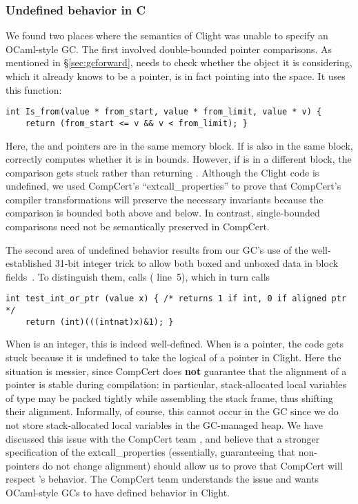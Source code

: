 \subsubsection*{Undefined behavior in C} %
We found two places where the semantics of Clight was unable to specify an OCaml-style GC.
The first involved double-bounded pointer comparisons.
As mentioned in \S\ref{sec:gcforward},  needs to
check whether the object it is considering, which it already knows to be a pointer,
is in fact pointing into the  space. It uses this function:
\begin{lstlisting}[numbers=none]
  int Is_from(value * from_start, value * from_limit, value * v) {
    return (from_start <= v && v < from_limit); }
\end{lstlisting}
Here, the  and  pointers are in the same
memory block. If  is also in the same block, 
correctly computes whether it is in bounds.
However, if  is in a different block, the comparison gets stuck rather than
returning .
Although the Clight code is undefined, we used CompCert's ``extcall{\_}properties''
to prove that CompCert's compiler transformations will preserve the necessary invariants
because the comparison is bounded both above and below. In contrast, single-bounded
comparisons need not be semantically preserved in CompCert.

The second area of undefined behavior results from our GC's use of the well-established
31-bit integer trick to allow both boxed and unboxed data in block fields~\cite{realworldocaml}.
To distinguish them,  calls  ({\color{black} line~5}), which
in turn calls
\begin{lstlisting}[numbers=none]
  int test_int_or_ptr (value x) { /* returns 1 if int, 0 if aligned ptr */
    return (int)(((intnat)x)&1); }
\end{lstlisting}
When  is an integer, this is indeed well-defined. 
When  is a pointer, the code gets stuck because
it is undefined to take the logical  of a pointer in Clight.
Here the situation is messier,
since CompCert does \textbf{not} guarantee that the alignment of a pointer is stable during
compilation: in particular, stack-allocated local variables of type  may be packed
tightly while assembling the stack frame, thus shifting their alignment.  Informally, of course,
this cannot occur in the GC since we do not store stack-allocated local variables in the GC-managed
heap.  We have discussed this issue with the CompCert team \cite{leroy_email}, and believe that
a stronger specification of the extcall{\_}properties (essentially, guaranteeing that non- pointers do not change alignment) should allow us to prove that CompCert
will respect 's behavior.  The CompCert team understands the
issue and wants OCaml-style GCs to have defined behavior in Clight.


